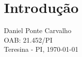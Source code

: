 \documentclass[article, 12pt, oneside,	a4paper, english, brazil, sumario=tradicional]{abntex2}
\begin{document}
\frenchspacing
\textual
\pagestyle{meuestilo}
\section{Introdução}

\vspace{2cm}
\begingroup
\centering

Daniel Ponte Carvalho\\ OAB: 21.452/PI \\ Teresina - PI, \today

\endgroup
\postextual

{}%
\end{document}
